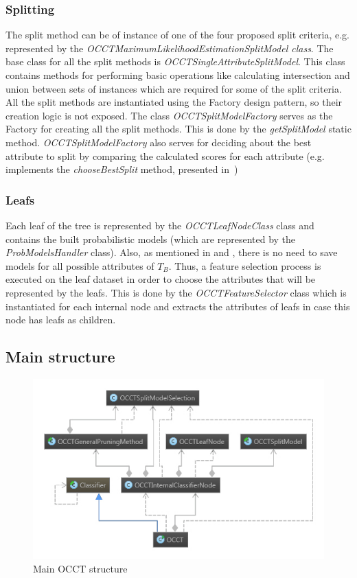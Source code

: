 \documentclass[a4paper,12pt]{article}
\begin{document}
\begin{spacing}{1.5}
\subsubsection{Splitting}\label{sec:splitting}
The split method can be of instance of one of the four proposed split criteria, e.g. represented by the {\em OCCTMaximumLikelihoodEstimationSplitModel class}. The base class for all the split methods is {\em OCCTSingleAttributeSplitModel}. This class contains methods for performing basic operations like calculating intersection and union between sets of instances which are required for some of the split criteria. All the split methods are instantiated using the Factory design pattern, so their creation logic is not exposed. The class {\em OCCTSplitModelFactory} serves as the Factory for creating all the  split methods. This is done by the {\em getSplitModel} static method. {\em OCCTSplitModelFactory} also serves for deciding about the best attribute to split by comparing the calculated scores for each attribute (e.g. implements the {\em chooseBestSplit} method, presented in~\cite{dror2011thesis,dror2014occt})

\subsubsection{Leafs}
Each leaf of the tree is represented by the {\em OCCTLeafNodeClass} class and contains the built probabilistic models (which are represented by the {\em ProbModelsHandler} class). Also, as mentioned in \cite{dror2011thesis} and \cite{dror2014occt}, there is no need to save models for all possible attributes of $T_B$. Thus, a feature selection process is executed on the leaf dataset in order to choose the attributes that will be represented by the leafs. This is done by the {\em OCCTFeatureSelector} class which is instantiated for each internal node and extracts the attributes of leafs in case this node has leafs as children.



\clearpage
\subsection{Main structure}
\begin{figure}[!h]
    \centering
\includegraphics[width=1\textwidth]{Figures/MainStructure}
    \caption{Main OCCT structure}
    \label{fig:mainstr}
\end{figure}


\end{spacing}
\end{document}
